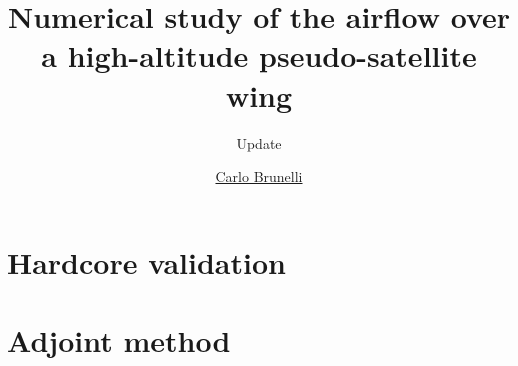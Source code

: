 \documentclass{beamer}
\title{Numerical study of the airflow over a high-altitude pseudo-satellite wing}
\subtitle{Update}
\author{\href{mailto:mail@carlobrunelli.com}{Carlo Brunelli}}
\begin{document}
\maketitle


\section{Hardcore validation}



\section{Adjoint method}

\end{document}
